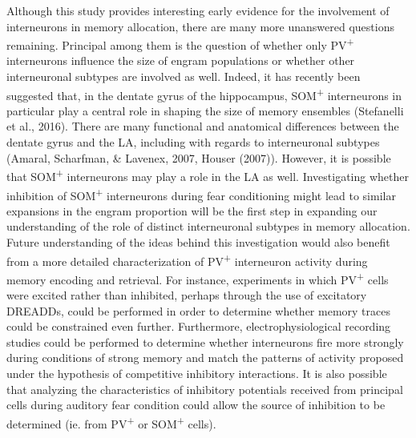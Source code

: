 \documentclass[12pt,a4paperpaper,]{report}
\begin{document}
Although this study provides interesting early evidence for the
involvement of interneurons in memory allocation, there are many more
unanswered questions remaining. Principal among them is the question of
whether only PV\textsuperscript{+} interneurons influence the size of
engram populations or whether other interneuronal subtypes are involved
as well. Indeed, it has recently been suggested that, in the dentate
gyrus of the hippocampus, SOM\textsuperscript{+} interneurons in
particular play a central role in shaping the size of memory ensembles
(Stefanelli et al., 2016). There are many functional and anatomical
differences between the dentate gyrus and the LA, including with regards
to interneuronal subtypes (Amaral, Scharfman, \& Lavenex, 2007, Houser
(2007)). However, it is possible that SOM\textsuperscript{+}
interneurons may play a role in the LA as well. Investigating whether
inhibition of SOM\textsuperscript{+} interneurons during fear
conditioning might lead to similar expansions in the engram proportion
will be the first step in expanding our understanding of the role of
distinct interneuronal subtypes in memory allocation. Future
understanding of the ideas behind this investigation would also benefit
from a more detailed characterization of PV\textsuperscript{+}
interneuron activity during memory encoding and retrieval. For instance,
experiments in which PV\textsuperscript{+} cells were excited rather
than inhibited, perhaps through the use of excitatory DREADDs, could be
performed in order to determine whether memory traces could be
constrained even further. Furthermore, electrophysiological recording
studies could be performed to determine whether interneurons fire more
strongly during conditions of strong memory and match the patterns of
activity proposed under the hypothesis of competitive inhibitory
interactions. It is also possible that analyzing the characteristics of
inhibitory potentials received from principal cells during auditory fear
condition could allow the source of inhibition to be determined (ie.
from PV\textsuperscript{+} or SOM\textsuperscript{+} cells).
\end{document}
